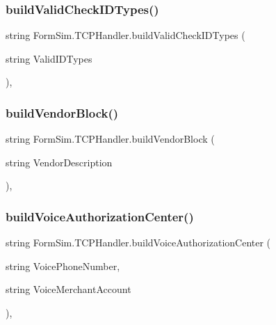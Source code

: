 \subsubsection{\texorpdfstring{build\+Valid\+Check\+I\+D\+Types()}{buildValidCheckIDTypes()}}
{\footnotesize\ttfamily string Form\+Sim.\+T\+C\+P\+Handler.\+build\+Valid\+Check\+I\+D\+Types (\begin{DoxyParamCaption}\item[{string}]{Valid\+I\+D\+Types }\end{DoxyParamCaption})\hspace{0.3cm}{\ttfamily [inline]}, {\ttfamily [private]}}

\mbox{\label{class_form_sim_1_1_t_c_p_handler_a87f8f6969a00e3c1f1f9510c3317c722}} 
\subsubsection{\texorpdfstring{build\+Vendor\+Block()}{buildVendorBlock()}}
{\footnotesize\ttfamily string Form\+Sim.\+T\+C\+P\+Handler.\+build\+Vendor\+Block (\begin{DoxyParamCaption}\item[{string}]{Vendor\+Description }\end{DoxyParamCaption})\hspace{0.3cm}{\ttfamily [inline]}, {\ttfamily [private]}}

\mbox{\label{class_form_sim_1_1_t_c_p_handler_a40eab47f3a9bffb4d3e4c35c060fabb9}} 
\subsubsection{\texorpdfstring{build\+Voice\+Authorization\+Center()}{buildVoiceAuthorizationCenter()}}
{\footnotesize\ttfamily string Form\+Sim.\+T\+C\+P\+Handler.\+build\+Voice\+Authorization\+Center (\begin{DoxyParamCaption}\item[{string}]{Voice\+Phone\+Number,  }\item[{string}]{Voice\+Merchant\+Account }\end{DoxyParamCaption})\hspace{0.3cm}{\ttfamily [inline]}, {\ttfamily [private]}}

